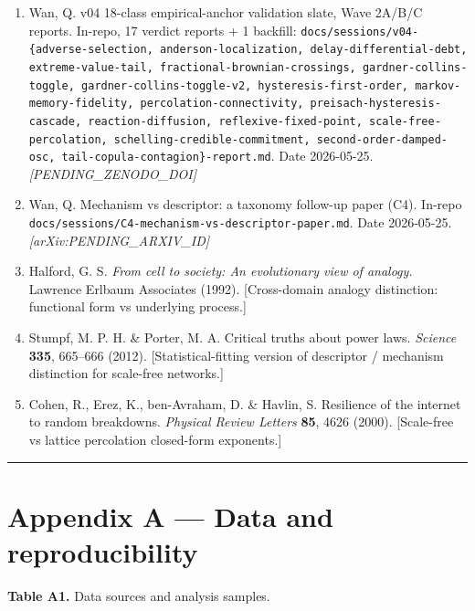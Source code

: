 \documentclass[
  11pt]{article}
\providecommand{\tightlist}{%
  \setlength{\itemsep}{0pt}\setlength{\parskip}{0pt}}
\begin{document}
\begin{enumerate}
\def\labelenumi{\arabic{enumi}.}
\setcounter{enumi}{45}
\tightlist
\item
  Wan, Q. v04 18-class empirical-anchor validation slate, Wave 2A/B/C
  reports. In-repo, 17 verdict reports + 1 backfill:
  \texttt{docs/sessions/v04-\{adverse-selection, anderson-localization,
  delay-differential-debt, extreme-value-tail,
  fractional-brownian-crossings, gardner-collins-toggle,
  gardner-collins-toggle-v2, hysteresis-first-order,
  markov-memory-fidelity, percolation-connectivity,
  preisach-hysteresis-cascade, reaction-diffusion,
  reflexive-fixed-point, scale-free-percolation,
  schelling-credible-commitment, second-order-damped-osc,
  tail-copula-contagion\}-report.md}. Date 2026-05-25.
  \emph{{[}PENDING\_ZENODO\_DOI{]}}
\item
  Wan, Q. Mechanism vs descriptor: a taxonomy follow-up paper (C4).
  In-repo \texttt{docs/sessions/C4-mechanism-vs-descriptor-paper.md}.
  Date 2026-05-25. \emph{{[}arXiv:PENDING\_ARXIV\_ID{]}}
\item
  Halford, G. S. \emph{From cell to society: An evolutionary view of
  analogy.} Lawrence Erlbaum Associates (1992).
  {[}Cross-domain analogy distinction: functional form vs underlying
  process.{]}
\item
  Stumpf, M. P. H. \& Porter, M. A. Critical truths about power laws.
  \emph{Science} \textbf{335}, 665--666 (2012). {[}Statistical-fitting
  version of descriptor / mechanism distinction for scale-free
  networks.{]}
\item
  Cohen, R., Erez, K., ben-Avraham, D. \& Havlin, S. Resilience of the
  internet to random breakdowns. \emph{Physical Review Letters}
  \textbf{85}, 4626 (2000). {[}Scale-free vs lattice percolation
  closed-form exponents.{]}
\end{enumerate}

\begin{center}\rule{0.5\linewidth}{0.5pt}\end{center}

\section*{Appendix A --- Data and reproducibility}\label{appendix-a--data-and-reproducibility}

\textbf{Table A1.} Data sources and analysis samples.
\end{document}
